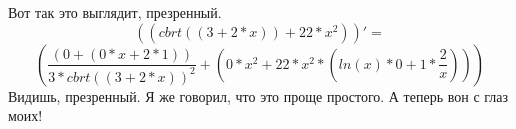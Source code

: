 \documentclass[a4paper,12pt]{article}
\begin{document}
Вот так это выглядит, презренный.
\begin{equation}
\left( \left( {cbrt \left( {\left( {3 }+ {{2 }* {x }}\right) }\right) }+ {{22 }* {{x }^ {2 }}}\right) \right)' =
\end{equation}
\begin{equation}
\left( {\frac{{\left( {0 }+ {\left( {{0 }* {x }}+ {{2 }* {1 }}\right) }\right) }}{{{3 }* {{cbrt \left( {\left( {3 }+ {{2 }* {x }}\right) }\right) }^ {2 }}}}}+ {\left( {{0 }* {{x }^ {2 }}}+ {{22 }* {{{x }^ {2 }}* {\left( {{ln \left( {x }\right) }* {0 }}+ {{1 }* {\frac{{2 }}{{x }}}}\right) }}}\right) }\right) 
\end{equation}
Видишь, презренный. Я же говорил, что это проще простого.
А теперь вон с глаз моих!
\end{document}
